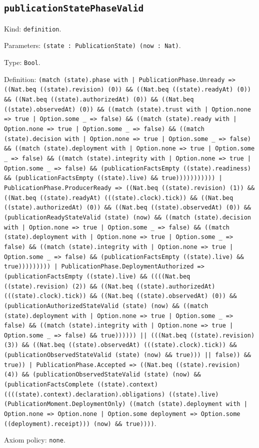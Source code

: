\documentclass[11pt]{article}
\begin{document}
\subsection*{\texttt{publicationStatePhaseValid}}
\noindent Kind: \texttt{definition}.\par
\noindent Parameters: \texttt{(state : PublicationState) (now : Nat)}.\par
\noindent Type: \texttt{Bool}.\par
\noindent Definition: \texttt{(match (state).phase with | PublicationPhase.Unready => ((Nat.beq ((state).revision) (0)) \&\& ((Nat.beq ((state).readyAt) (0)) \&\& ((Nat.beq ((state).authorizedAt) (0)) \&\& ((Nat.beq ((state).observedAt) (0)) \&\& ((match (state).trust with | Option.none => true | Option.some \_ => false) \&\& ((match (state).ready with | Option.none => true | Option.some \_ => false) \&\& ((match (state).decision with | Option.none => true | Option.some \_ => false) \&\& ((match (state).deployment with | Option.none => true | Option.some \_ => false) \&\& ((match (state).integrity with | Option.none => true | Option.some \_ => false) \&\& (publicationFactsEmpty ((state).readiness) \&\& (publicationFactsEmpty ((state).live) \&\& true))))))))))) | PublicationPhase.ProducerReady => ((Nat.beq ((state).revision) (1)) \&\& ((Nat.beq ((state).readyAt) (((state).clock).tick)) \&\& ((Nat.beq ((state).authorizedAt) (0)) \&\& ((Nat.beq ((state).observedAt) (0)) \&\& (publicationReadyStateValid (state) (now) \&\& ((match (state).decision with | Option.none => true | Option.some \_ => false) \&\& ((match (state).deployment with | Option.none => true | Option.some \_ => false) \&\& ((match (state).integrity with | Option.none => true | Option.some \_ => false) \&\& (publicationFactsEmpty ((state).live) \&\& true))))))))) | PublicationPhase.DeploymentAuthorized => (publicationFactsEmpty ((state).live) \&\& ((((Nat.beq ((state).revision) (2)) \&\& ((Nat.beq ((state).authorizedAt) (((state).clock).tick)) \&\& ((Nat.beq ((state).observedAt) (0)) \&\& (publicationAuthorizedStateValid (state) (now) \&\& ((match (state).deployment with | Option.none => true | Option.some \_ => false) \&\& ((match (state).integrity with | Option.none => true | Option.some \_ => false) \&\& true)))))) || (((Nat.beq ((state).revision) (3)) \&\& ((Nat.beq ((state).observedAt) (((state).clock).tick)) \&\& (publicationObservedStateValid (state) (now) \&\& true))) || false)) \&\& true)) | PublicationPhase.Accepted => ((Nat.beq ((state).revision) (4)) \&\& (publicationObservedStateValid (state) (now) \&\& (publicationFactsComplete ((state).context) ((((state).context).declaration).obligations) ((state).live) (PublicationMoment.DeploymentOnly) ((match (state).deployment with | Option.none => Option.none | Option.some deployment => Option.some ((deployment).receipt))) (now) \&\& true))))}.\par
\noindent Axiom policy: \texttt{none}.\par
\end{document}
